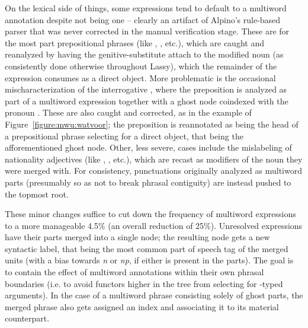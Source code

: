 On the lexical side of things, some expressions tend to default to a multiword annotation despite not being one -- clearly an artifact of Alpino's rule-based parser that was never corrected in the manual verification stage.
These are for the most part prepositional phrases (like , , etc.), which are caught and reanalyzed by having the genitive-substitute  attach to the modified noun (as consistently done otherwise throughout Lassy), which the remainder of the expression consumes as a direct object.
More problematic is the occasional mischaracterization of the interrogative , where the preposition  is analyzed as part of a multiword expression together with a ghost node coindexed with the pronoun .
These are also caught and corrected, as in the example of Figure~\ref{figure:mwu:watvoor}; the preposition is reannotated as being the head of a prepositional phrase selecting for a direct object, that being the afforementioned ghost node.
Other, less severe, cases include the mislabeling of nationality adjectives (like , , etc.), which are recast as modifiers of the noun they were merged with.
For consistency, punctuations originally analyzed as multiword parts (presumably so as not to break phrasal contiguity) are instead pushed to the topmost root.

These minor changes suffice to cut down the frequency of multiword expressions to a more manageable 4.5\% (an overall reduction of 25\%).
Unresolved expressions have their parts merged into a single node; the resulting node gets a new syntactic label, that being the most common part of speech tag of the merged units (with a bias towards \textit{n} or \textit{np}, if either is present in the parts).
The goal is to contain the effect of multiword annotations within their own phrasal boundaries (i.e. to avoid functors higher in the tree from selecting for -typed arguments).
In the case of a multiword phrase consisting solely of ghost parts, the merged phrase also gets assigned an index and associating it to its material counterpart.

